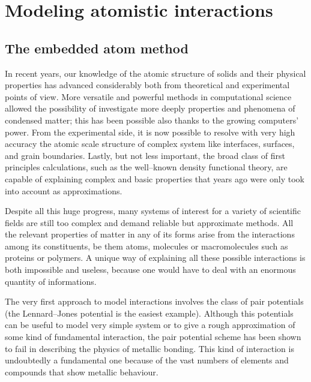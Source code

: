 \chapter{Modeling atomistic interactions}

\section{The embedded atom method}
In recent years, our knowledge of the atomic structure of solids and their physical properties has advanced considerably both from theoretical and experimental points of view. More versatile and powerful methods in computational science allowed the possibility of investigate more deeply properties and phenomena of condensed matter; this has been possible also thanks to the growing computers' power. From the experimental side, it is now possible to resolve with very high accuracy the atomic scale structure of complex system like interfaces, surfaces, and grain boundaries. Lastly, but not less important, the broad class of first principles calculations, such as the well--known density functional theory, are capable of explaining complex and basic properties that years ago were only took into account as approximations.

Despite all this huge progress, many systems of interest for a variety of scientific fields are still too complex and demand reliable but approximate methods. All the relevant properties of matter in any of its forms arise from the interactions among its constituents, be them atoms, molecules or macromolecules such as proteins or polymers. A unique way of explaining all these possible interactions is both impossible and useless, because one would have to deal with an enormous quantity of informations.

The very first approach to model interactions involves the class of pair potentials (the Lennard--Jones potential is the easiest example). Although this potentials can be useful to model very simple system or to give a rough approximation of some kind of fundamental
interaction, the pair potential scheme has been shown to fail in describing the physics of metallic bonding. This kind of interaction is undoubtedly a fundamental one because of the vast numbers of elements and compounds that show metallic behaviour.

